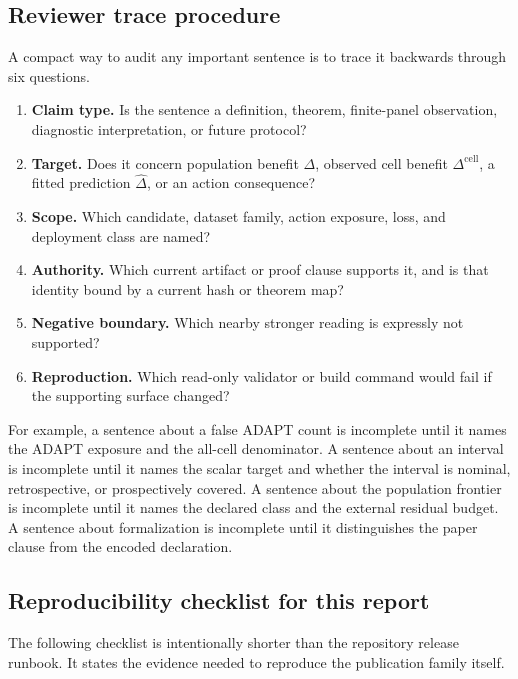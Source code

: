 \subsection{Reviewer trace procedure}
\label{fr:reviewer-trace}

A compact way to audit any important sentence is to trace it backwards through six questions.

\begin{enumerate}[leftmargin=*]
\item \textbf{Claim type.} Is the sentence a definition, theorem, finite-panel observation,
diagnostic interpretation, or future protocol?
\item \textbf{Target.} Does it concern population benefit $\Delta$, observed cell benefit
$\Delta^{\mathrm{cell}}$, a fitted prediction $\widehat\Delta$, or an action consequence?
\item \textbf{Scope.} Which candidate, dataset family, action exposure, loss, and deployment class
are named?
\item \textbf{Authority.} Which current artifact or proof clause supports it, and is that identity
bound by a current hash or theorem map?
\item \textbf{Negative boundary.} Which nearby stronger reading is expressly not supported?
\item \textbf{Reproduction.} Which read-only validator or build command would fail if the supporting
surface changed?
\end{enumerate}

For example, a sentence about a false ADAPT count is incomplete until it names the ADAPT exposure
and the all-cell denominator.  A sentence about an interval is incomplete until it names the
scalar target and whether the interval is nominal, retrospective, or prospectively covered.  A
sentence about the population frontier is incomplete until it names the declared class and the
external residual budget.  A sentence about formalization is incomplete until it distinguishes
the paper clause from the encoded declaration.

\subsection{Reproducibility checklist for this report}
\label{fr:report-checklist}

The following checklist is intentionally shorter than the repository release runbook.  It states
the evidence needed to reproduce the publication family itself.

